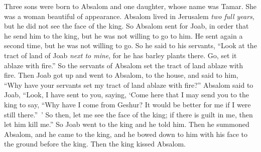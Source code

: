 \begin{biblechapter}
\verse Three sons were born to Absalom and one daughter, whose name was Tamar. She was a woman beautiful of appearance.
\verse Absalom lived in Jerusalem \textit{two full years}, but he did not see the face of the king.
\verse So Absalom sent for Joab, in order that he send him to the king, but he was not willing to go to him. He sent again a second time, but he was not willing to go.
\verse So he said to his servants, “Look at the tract of land of Joab \textit{next to mine}, for he has barley plants there. Go, set it ablaze with fire.” So the servants of Absalom set the tract of land ablaze with fire.
\verse Then Joab got up and went to Absalom, to the house, and said to him, “Why have your servants set my tract of land ablaze with fire?”
\verse Absalom said to Joab, “Look, I have sent to you, saying, ‘Come here that I may send you to the king to say, “Why have I come from Geshur? It would be better for me if I were still there.” ’ So then, let me see the face of the king; if there is guilt in me, then let him kill me.”
\verse So Joab went to the king and he told him. Then he summoned Absalom, and he came to the king, and he bowed down to him with his face to the ground before the king. Then the king kissed Absalom.
\end{biblechapter}


